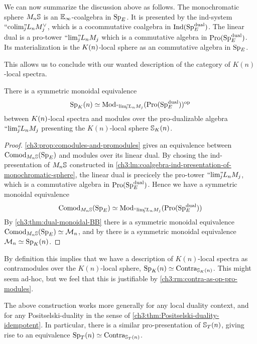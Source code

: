 We can now summarize the discussion above as follows. The monochromatic sphere $M_n\S$ is an $\E_\infty$-coalgebra in $\SpE$. It is presented by the ind-system $\indcolim L_n M_j^\vee$, which is a cocommutative coalgebra in $\Ind(\SpE\dual)$. The linear dual is a pro-tower $\prolim L_n M_j$ which is a commutative algebra in $\Pro(\SpE\dual)$. Its materialization is the $\Kn$-local sphere as an commutative algebra in $\SpE$. 

This allows us to conclude with our wanted description of the category of $K(n)$-local spectra. 

\begin{theorem}
    \label{ch3:thm:Kn-is-pro-modules}
    There is a symmetric monoidal equivalence 
    \[\Sp_\Kn \simeq \Mod_{\prolim L_n M_j}(\Pro(\SpE\dual))\op\]
    between $\Kn$-local spectra and modules over the pro-dualizable algebra $\prolim L_n M_j$ presenting the $K(n)$-local sphere $\S_\Kn$. 
\end{theorem}
\begin{proof}
    \cref{ch3:prop:comodules-and-promodules} gives an equivalence between $\Comod_{M_n \S}(\SpE)$ and modules over its linear dual. By chosing the ind-presentation of $M_n \S$ constructed in \cref{ch3:lm:coalgebra-ind-presentation-of-monochromatic-sphere}, the linear dual is precicely the pro-tower $\prolim L_n M_j$, which is a commutative algebra in $\Pro(\SpE\dual)$. Hence we have a symmetric monoidal equivalence 
    \[\Comod_{M_n\S}(\SpE)\simeq \Mod_{\prolim L_n M_j}(\Pro(\SpE\dual))\]
    By \cref{ch3:thm:dual-monoidal-BB} there is a symmetric monoidal equivalence $\Comod_{M_n\S}(\SpE)\simeq \Mn$, and by \cite[6.19]{hovey-strickland_99} there is a symmetric monoidal equivalence $\Mn \simeq \Sp_\Kn$. 
\end{proof}

\begin{remark}
    By definition this implies that we have a description of $K(n)$-local spectra as contramodules over the $K(n)$-local sphere, $\Sp_\Kn \simeq \Contra_{\S_\Kn}$. This might seem ad-hoc, but we feel that this is justifiable by \cref{ch3:rm:contra-as-op-pro-modules}.
\end{remark}

\begin{remark}
    The above construction works more generally for any local duality context, and for any Positselski-duality in the sense of \cref{ch3:thm:Positselski-duality-idempotent}. In particular, there is a similar pro-presentation of $\S_\Tn$, giving rise to an equivalence $\Sp_\Tn\simeq \Contra_{\S_\Tn}$.
\end{remark}

